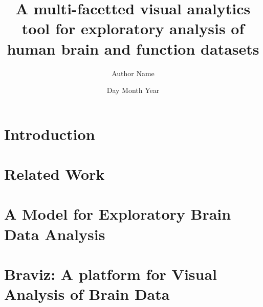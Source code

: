 \documentclass[12pt]{report}
\begin{document}
\title{
	{A multi-facetted visual analytics tool for exploratory analysis of human brain and function datasets}\\
}
\author{Author Name}
\date{Day Month Year}

\maketitle

%
%
%

\tableofcontents

\chapter{Introduction}
\label{chap_intro}


\chapter{Related Work}
\label{chap_related}


\chapter{A Model for Exploratory Brain Data Analysis}
\label{chap_model}


\chapter{Braviz: A platform for Visual Analysis of Brain Data}
\label{chap_braviz}

\end{document}
